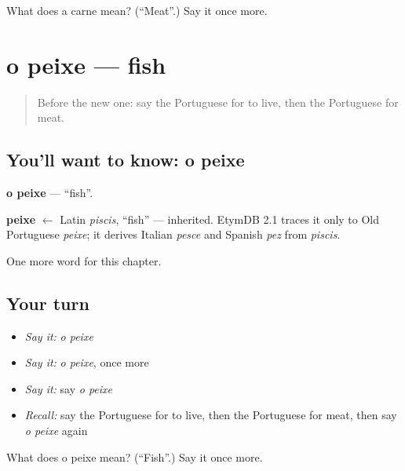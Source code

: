 \begin{tcolorbox}[breakable,colback=teal!4,colframe=teal!35!black,title={Before you move on}]
What does a carne mean? (\textquotedblleft{}Meat\textquotedblright{}.) Say it once more.
\end{tcolorbox}
\section[o peixe]{o peixe — fish}

\label{lesson:PT-C44-peixe}



\begin{quote}
Before the new one: say the Portuguese for to live, then the Portuguese for meat.
\end{quote}

\subsection*{You'll want to know: o peixe}
\textbf{o peixe} — \textquotedblleft{}fish\textquotedblright{}.

\begin{cousinweb}
\textbf{peixe} $\leftarrow$ Latin \emph{piscis}, \textquotedblleft{}fish\textquotedblright{} — inherited. EtymDB 2.1 traces it only to Old Portuguese \emph{peixe}; it derives Italian \emph{pesce} and Spanish \emph{pez} from \emph{piscis}.
\end{cousinweb}

\begin{grammarlens}[title={What you've built}]
One more word for this chapter.
\end{grammarlens}

\subsection*{Your turn}
\begin{itemize}
\raggedright
  \item \emph{Say it:} \emph{o peixe}
  \item \emph{Say it:} \emph{o peixe}, once more
  \item \emph{Say it:} say \emph{o peixe}
  \item \emph{Recall:} say the Portuguese for to live, then the Portuguese for meat, then say \emph{o peixe} again
\end{itemize}

\begin{tcolorbox}[breakable,colback=teal!4,colframe=teal!35!black,title={Before you move on}]
What does o peixe mean? (\textquotedblleft{}Fish\textquotedblright{}.) Say it once more.
\end{tcolorbox}
